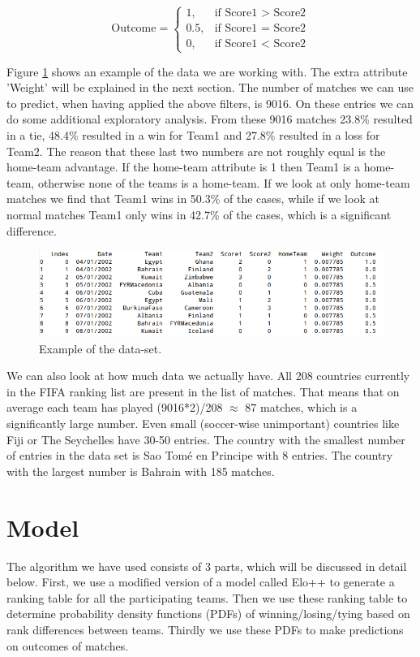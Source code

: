 \documentclass{llncs}
\begin{document}
\begin{equation*}
  \text{Outcome} =
  \begin{cases}
    1, & \text{if Score1 > Score2} \\
    0.5, & \text{if Score1 = Score2} \\
    0, & \text{if Score1 < Score2}
  \end{cases}
\end{equation*}

Figure \ref{fig:ex} shows an example of the data we are working with. The extra attribute 'Weight' will be explained in the next section. The number of matches we can use to predict, when having applied the above filters, is 9016. On these entries we can do some additional exploratory analysis. From these 9016 matches 23.8\% resulted in a tie, 48.4\% resulted in a win for Team1 and 27.8\% resulted in a loss for Team2. The reason that these last two numbers are not roughly equal is the home-team advantage. If the home-team attribute is 1 then Team1 is a home-team, otherwise none of the teams is a home-team. If we look at only home-team matches we find that Team1 wins in 50.3\% of the cases, while if we look at normal matches Team1 only wins in 42.7\% of the cases, which is a significant difference.

\begin{figure}
  \centering
  \includegraphics[width=1.0\textwidth]{ex.png}
  \caption{Example of the data-set.}
  \label{fig:ex}
\end{figure}

We can also look at how much data we actually have. All 208 countries currently in the FIFA ranking list are present in the list of matches. That means that on average each team has played (9016*2)/208 $\approx$ 87 matches, which is a significantly large number. Even small (soccer-wise unimportant) countries like Fiji or The Seychelles have 30-50 entries. The country with the smallest number of entries in the data set is Sao Tom\'e en Principe with 8 entries. The country with the largest number is Bahrain with 185 matches.

\section{Model}
The algorithm we have used consists of 3 parts, which will be discussed in detail below. First, we use a modified version of a model called Elo++ to generate a ranking table for all the participating teams. Then we use these ranking table to determine probability density functions (PDFs) of winning/losing/tying based on rank differences between teams. Thirdly we use these PDFs to make predictions on outcomes of matches.
\end{document}
